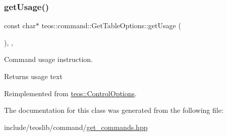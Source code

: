 \subsubsection{\texorpdfstring{get\+Usage()}{getUsage()}}
{\footnotesize\ttfamily const char$\ast$ teos\+::command\+::\+Get\+Table\+Options\+::get\+Usage (\begin{DoxyParamCaption}{ }\end{DoxyParamCaption})\hspace{0.3cm}{\ttfamily [inline]}, {\ttfamily [protected]}, {\ttfamily [virtual]}}



Command \textquotesingle{}usage\textquotesingle{} instruction. 

\begin{DoxyReturn}{Returns}
usage text 
\end{DoxyReturn}


Reimplemented from \mbox{\hyperlink{classteos_1_1_control_options_a0aa5671f9bc750ed5280c26c543874f3}{teos\+::\+Control\+Options}}.



The documentation for this class was generated from the following file\+:\begin{DoxyCompactItemize}
\item 
include/teoslib/command/\mbox{\hyperlink{get__commands_8hpp}{get\+\_\+commands.\+hpp}}\end{DoxyCompactItemize}
